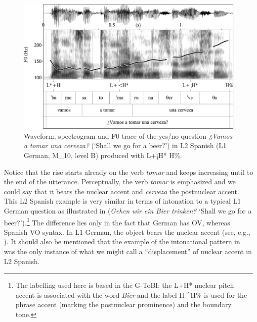 \begin{figure}


\includegraphics[width=\textwidth]{figures/Figure_4.75.png}



\caption{Waveform, spectrogram and F0 trace of the yes/no question \textit{¿Vamos a tomar una cerveza?} (‘Shall we go for a beer?’) in L2 Spanish (L1 German, M\_10, level B) produced with L+¡H* H\%.}
\label{fig:4.75}
\end{figure}

Notice that the rise starts already on the verb \textit{tomar} and keeps increasing until to the end of the utterance. Perceptually, the verb \textit{tomar} is emphasized and we could say that it bears the nuclear accent and \textit{cerveza} the postnuclear accent. This L2 Spanish example is very similar in terms of intonation to a typical L1 German question as illustrated in  (\textit{Gehen wir ein Bier trinken?} ‘Shall we go for a beer?’).\footnote{The labelling used here is based in the G-ToBI: the L+H* nuclear pitch accent is associated with the word \textit{Bier} and the label H-\^{}H\% is used for the phrase accent (marking the postnuclear prominence) and the boundary tone.} The difference lies only in the fact that German has OV, whereas Spanish VO syntax. In L1 German, the object bears the nuclear accent (see, e.g., \citealt{FéryKügler2008}). It should also be mentioned that the example of the intonational pattern in  was the only instance of what we might call a “displacement” of nuclear accent in L2 Spanish.

